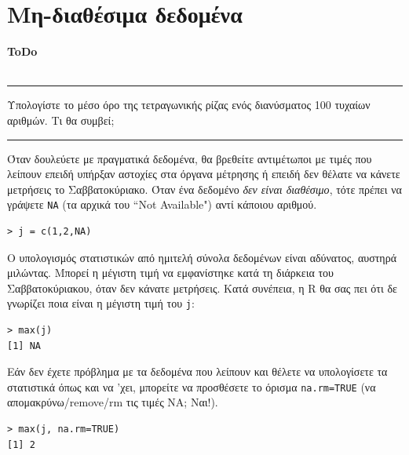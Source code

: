 \documentclass[a4paper,10pt,twocolumn]{article}
\newenvironment{ToDo} {
  \begin{flushright}
    \hfill
    \begin{minipage}{0.9\columnwidth}
    \textsf{\textbf{ToDo}} \\
      \vspace{-0.7cm}\\
      {\color{Gray}\rule[-0.05cm]{\columnwidth}{1.5pt}}} {
      {\color{Gray}\rule[0.3cm]{\columnwidth}{1.5pt}}
    \end{minipage}
    \vspace{0.3cm}
  \end{flushright}
  }
\begin{document}
\section{Μη-διαθέσιμα δεδομένα}

\begin{ToDo}
Υπολογίστε το μέσο όρο της τετραγωνικής ρίζας ενός διανύσματος 100 τυχαίων αριθμών. Τι θα συμβεί;
\end{ToDo}

Όταν δουλεύετε με πραγματικά δεδομένα, θα βρεθείτε αντιμέτωποι με τιμές που λείπουν επειδή υπήρξαν αστοχίες
στα όργανα μέτρησης ή επειδή δεν θέλατε να κάνετε μετρήσεις το Σαββατοκύριακο. Όταν ένα δεδομένο \emph{δεν
είναι διαθέσιμο}, τότε πρέπει να γράψετε \texttt{NA} (τα αρχικά του ``Not Available") αντί κάποιου αριθμού. 

\begin{Verbatim}[frame=single,gobble=0]
> j = c(1,2,NA)
\end{Verbatim}

Ο υπολογισμός στατιστικών από ημιτελή σύνολα δεδομένων είναι αδύνατος, αυστηρά μιλώντας. Μπορεί η μέγιστη τιμή
να εμφανίστηκε κατά τη διάρκεια του Σαββατοκύριακου, όταν δεν κάνατε μετρήσεις. Κατά συνέπεια, η R θα σας πει
ότι δε γνωρίζει ποια είναι η μέγιστη τιμή του \texttt{j}: 

\begin{Verbatim}[frame=single,gobble=0]
> max(j)
[1] NA
\end{Verbatim}

Εάν δεν έχετε πρόβλημα με τα δεδομένα που λείπουν και θέλετε να υπολογίσετε τα στατιστικά όπως και να 'χει,
μπορείτε να προσθέσετε το όρισμα \texttt{na.rm=TRUE} (να απομακρύνω/remove/rm τις τιμές NA; Ναι!). 

\begin{Verbatim}[frame=single,gobble=0]
> max(j, na.rm=TRUE)
[1] 2
\end{Verbatim}


\end{document}
